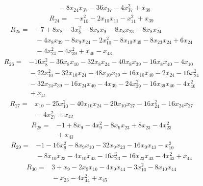 {\begin{align*}
&{}  - 8x_{24} x_{37} - 36x_{37} - 4x_{37}^{2} + x_{38}
\end{align*}
\begin{align*}
R_{24} ={}& -x_{10}^{2} - 2x_{10} x_{11} - x_{11}^{2} + x_{39}
\end{align*}
\begin{align*}
R_{25} ={}& -7 + 8x_{8} - 3x_{8}^{2} - 8x_{8} x_{9} - 8x_{8} x_{23} - 8x_{8} x_{24} \\
&{}  - 4x_{8} x_{39} - 8x_{9} x_{24} - 2x_{10}^{2} - 8x_{10} x_{39} - 8x_{23} x_{24} + 6x_{24} \\
&{}  - 4x_{24}^{2} - 4x_{39}^{2} + x_{40} - x_{43}
\end{align*}
\begin{align*}
R_{26} ={}& -16x_{8}^{2} - 36x_{8} x_{10} - 32x_{8} x_{24} - 40x_{8} x_{39} - 16x_{8} x_{40} - 4x_{10} \\
&{}  - 22x_{10}^{2} - 32x_{10} x_{24} - 48x_{10} x_{39} - 16x_{10} x_{40} - 2x_{24} - 16x_{24}^{2} \\
&{}  - 32x_{24} x_{39} - 16x_{24} x_{40} - 4x_{39} - 24x_{39}^{2} - 16x_{39} x_{40} - 4x_{40}^{2} \\
&{}  + x_{41}
\end{align*}
\begin{align*}
R_{27} ={}& x_{10} - 25x_{10}^{2} - 40x_{10} x_{24} - 20x_{10} x_{27} - 16x_{24}^{2} - 16x_{24} x_{27} \\
&{}  - 4x_{27}^{2} + x_{42}
\end{align*}
\begin{align*}
R_{28} ={}& -1 + 8x_{9} - 4x_{9}^{2} - 8x_{9} x_{23} + 8x_{23} - 4x_{23}^{2} \\
&{}  + x_{43}
\end{align*}
\begin{align*}
R_{29} ={}& -1 - 16x_{9}^{2} - 8x_{9} x_{10} - 32x_{9} x_{23} - 16x_{9} x_{43} - x_{10}^{2} \\
&{}  - 8x_{10} x_{23} - 4x_{10} x_{43} - 16x_{23}^{2} - 16x_{23} x_{43} - 4x_{43}^{2} + x_{44}
\end{align*}
\begin{align*}
R_{30} ={}& 3 + x_{9} - 2x_{9} x_{10} - 4x_{9} x_{44} - 3x_{10}^{2} - 8x_{10} x_{44} \\
&{}  - x_{23} - 4x_{44}^{2} + x_{45}

\end{align*}}
